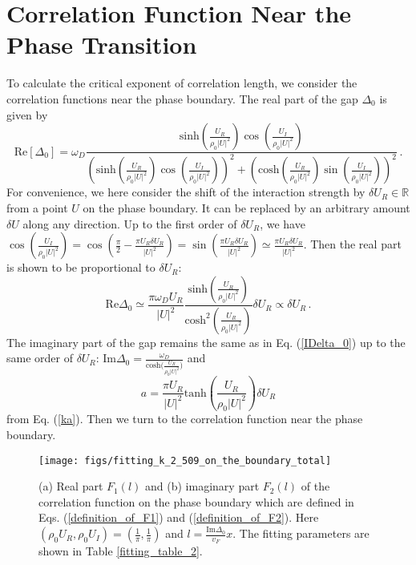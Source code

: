 \documentclass[aps,onecolumn,superscriptaddress,notitlepage,longbibliography]{revtex4-1}
\begin{document}
\section{Correlation Function Near the Phase Transition}

To calculate the critical exponent of correlation length, we consider the correlation functions near the phase boundary.  The real part of the gap $\Delta_0$ is given by
\begin{equation}
  \text{Re} [\Delta_0] = \omega_D \frac{\text{sinh} \left( \frac{U_R}{\rho_0 |
  U |^2} \right) \cos \left( \frac{U_I}{ \rho_0 | U |^2}
  \right)}{\left( \text{sinh} \left( \frac{U_R}{\rho_0 | U |^2} \right)
  \cos \left( \frac{U_I}{ \rho_0 | U |^2} \right) \right)^2 + \left(
  \text{cosh} \left( \frac{U_R}{\rho_0 | U |^2} \right) \sin \left(
  \frac{U_I}{ \rho_0 | U |^2} \right) \right)^2}\,.\label{Real_gap}
\end{equation}
For convenience, we here consider the shift of the interaction strength by $\delta U_R\in\mathbb{R}$ from a point $U$ on the phase boundary. It can be replaced by an arbitrary amount $\delta U$ along any direction. Up to the first order of $\delta U_R$, we have $\cos \left(
\frac{U_I}{ \rho_0 | U |^2} \right) = \cos \left( \frac{\pi}{2}-\frac{\pi U_R\delta U_R}{|U|^2} \right)=\sin \left(\frac{\pi U_R\delta U_R}{|U|^2} \right) \simeq \frac{\pi U_R\delta U_R}{|U|^2}$. Then the real part is shown to be proportional to $\delta U_R$:
\begin{equation}
  \text{Re} \Delta_0 \simeq \frac{\pi\omega_D U_R}{| U |^2} \frac{\text{sinh}
  \left( \frac{U_R}{\rho_0 | U |^2} \right)}{\text{cosh}^2 \left(
  \frac{U_R}{\rho_0 | U |^2} \right)} \delta U_R \propto \delta U_R\,.
  \label{define_UR_deviation}
\end{equation}
The imaginary part of the gap remains the same as in Eq. (\ref{IDelta_0}) up to the same order of $\delta U_R$: $\text{Im} \Delta_0 =
\frac{\omega_D}{\text{cosh($\frac{U_R}{\rho_0 | U |^2}$)}}$ and   
\begin{equation}
 a=\frac{\pi U_R}{|U|^2}\text{tanh}(\frac{U_R}{\rho_0|U|^2})\delta U_R
 \label{detailed_expression_a}
\end{equation}
from Eq. (\ref{ka}). Then we turn to the correlation function near the phase boundary.

\begin{figure}
	\centering \texttt{[image: figs/fitting\_k\_2\_509\_on\_the\_boundary\_total]}
	\caption{(a) Real part $F_1(l)$ and (b) imaginary part $F_2(l)$ of the correlation function on the phase boundary which are defined in Eqs. (\ref{definition_of_F1}) and (\ref{definition_of_F2}). Here $(\rho_{0}U_{R},\rho_{0}U_{I})=(\frac{1}{\pi},\frac{1}{\pi})$ and $l=\frac{\text{Im}\Delta_0}{v_F}x$. The fitting parameters are shown in Table \ref{fitting_table_2}.}
	\label{fig2}
\end{figure}
\end{document}
